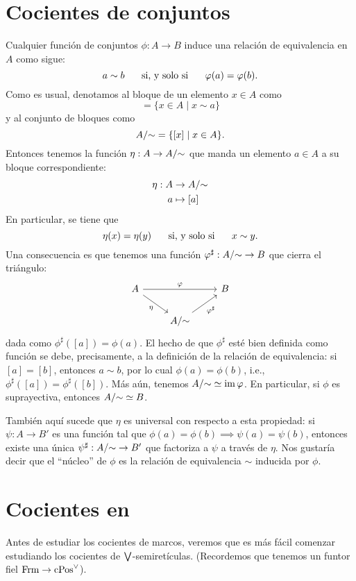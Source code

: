 \section{Cocientes de conjuntos}
Cualquier función de conjuntos $\phi:A\to B$ induce una relación de
equivalencia en $A$ como sigue:
\[
    a\sim b \hspace{5mm}\text{ si, y solo si }\hspace{5mm} \varphi(a) = \varphi(b)
.\]
Como es usual, denotamos al bloque de un elemento $x\in A$ como
\begin{equation}
  [a]=\{x\in A\mid x\sim a\}
\end{equation}
y al conjunto de bloques como
\begin{equation}
  A/{\sim}
  =
  \{[x] \mid x\in A\}
.\end{equation}
Entonces tenemos la función $\eta: A\to A/{\sim}$ que manda un
elemento $a\in A$ a su bloque correspondiente:
\begin{align*}
    \eta:A&\to A/{\sim} \\
    a&\mapsto [a]
\end{align*}
En particular, se tiene que
\[
    \eta(x) = \eta(y) \hspace{5mm}\text{ si, y solo si }\hspace{5mm} x\sim y
.\]
Una consecuencia es que tenemos una función
$\varphi^\sharp:A/{\sim} \to B$ que cierra el triángulo:
\[
\begin{tikzcd}
    A\ar[rr,"\phi"] \ar[dr,"\eta"'] && B \\
    & A/\simr \ar[ur,"\phi^\sharp"']
\end{tikzcd}
\]
dada como $\phi^\sharp([a]) = \phi(a)$.
El hecho de que $\phi^\sharp$ esté bien definida como función se debe,
precisamente, a la definición de la relación de equivalencia:
si $[a]=[b]$, entonces $a\sim b$, por lo cual $\phi(a)=\phi(b)$, i.e.,
$\phi^\sharp([a])=\phi^\sharp([b])$.
Más aún, tenemos $A/{\sim}\simeq \operatorname{im} \varphi$.
En particular, si $\phi$ es suprayectiva, entonces $A/{\sim} \simeq B$.

También aquí sucede que $\eta$ es universal con respecto a esta
propiedad: si $\psi:A\to B'$ es una función tal que
$\phi(a)=\phi(b)\implies \psi(a)=\psi(b)$,
entonces existe una única $\psi^\sharp:A/{\sim}\to B'$
que factoriza a $\psi$ a través de $\eta$.
Nos gustaría decir que el ``núcleo'' de $\phi$ es la relación de
equivalencia $\sim$ inducida por $\phi$.

\section{Cocientes en }
Antes de estudiar los cocientes de marcos, veremos que es más fácil
comenzar estudiando los cocientes de $\bigvee$-semiretículas.
(Recordemos que tenemos un funtor fiel $\mathrm{Frm}\to\mathrm{cPos}^\vee$).

